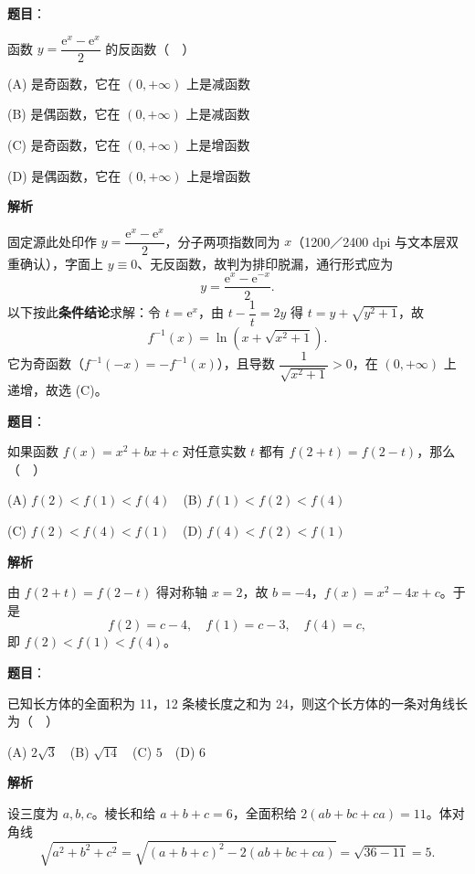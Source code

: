\begin{answer}

\textbf{题目}：

函数 \(y=\dfrac{\mathrm{e}^x-\mathrm{e}^x}{2}\) 的反函数（　）

(A) 是奇函数，它在 \((0,+\infty)\) 上是减函数

(B) 是偶函数，它在 \((0,+\infty)\) 上是减函数

(C) 是奇函数，它在 \((0,+\infty)\) 上是增函数

(D) 是偶函数，它在 \((0,+\infty)\) 上是增函数

\textbf{解析}

固定源此处印作 \(y=\dfrac{\mathrm{e}^{x}-\mathrm{e}^{x}}{2}\)，分子两项指数同为 \(x\)（1200／2400 dpi 与文本层双重确认），字面上 \(y\equiv0\)、无反函数，故判为排印脱漏，通行形式应为
\nopagebreak[4]
\[
y=\frac{\mathrm{e}^{x}-\mathrm{e}^{-x}}{2}.
\]
以下按此\textbf{条件结论}求解：令 \(t=\mathrm{e}^x\)，由 \(t-\dfrac1t=2y\) 得 \(t=y+\sqrt{y^2+1}\)，故
\nopagebreak[4]
\[
f^{-1}(x)=\ln\left(x+\sqrt{x^2+1}\right).
\]
它为奇函数（\(f^{-1}(-x)=-f^{-1}(x)\)），且导数 \(\dfrac{1}{\sqrt{x^2+1}}>0\)，在 \((0,+\infty)\) 上递增，故选 (C)。


\end{answer}
\begin{answer}

\textbf{题目}：

如果函数 \(f(x)=x^2+bx+c\) 对任意实数 \(t\) 都有 \(f(2+t)=f(2-t)\)，那么（　）

(A) \(f(2)<f(1)<f(4)\)　(B) \(f(1)<f(2)<f(4)\)

(C) \(f(2)<f(4)<f(1)\)　(D) \(f(4)<f(2)<f(1)\)

\textbf{解析}

由 \(f(2+t)=f(2-t)\) 得对称轴 \(x=2\)，故 \(b=-4\)，\(f(x)=x^2-4x+c\)。于是
\nopagebreak[4]
\[
f(2)=c-4,\quad f(1)=c-3,\quad f(4)=c,
\]
即 \(f(2)<f(1)<f(4)\)。


\end{answer}
\begin{answer}

\textbf{题目}：

已知长方体的全面积为 11，12 条棱长度之和为 24，则这个长方体的一条对角线长为（　）

(A) \(2\sqrt{3}\)　(B) \(\sqrt{14}\)　(C) \(5\)　(D) \(6\)

\textbf{解析}

设三度为 \(a,b,c\)。棱长和给 \(a+b+c=6\)，全面积给 \(2(ab+bc+ca)=11\)。体对角线
\nopagebreak[4]
\[
\sqrt{a^2+b^2+c^2}
=\sqrt{(a+b+c)^2-2(ab+bc+ca)}
=\sqrt{36-11}=5.
\]


\end{answer}
